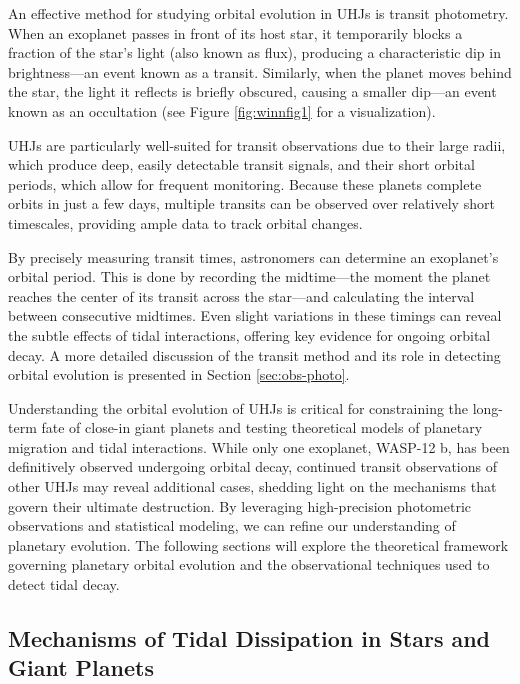 \documentclass[oneside,12pt]{amsart}
\numberwithin{page}{section}
\begin{document}
An effective method for studying orbital evolution in UHJs is transit photometry. When an exoplanet passes in front of its host star, it temporarily blocks a fraction of the star’s light (also known as flux), producing a characteristic dip in brightness—an event known as a transit. Similarly, when the planet moves behind the star, the light it reflects is briefly obscured, causing a smaller dip—an event known as an occultation (see Figure \ref{fig:winnfig1} for a visualization).

UHJs are particularly well-suited for transit observations due to their large radii, which produce deep, easily detectable transit signals, and their short orbital periods, which allow for frequent monitoring. Because these planets complete orbits in just a few days, multiple transits can be observed over relatively short timescales, providing ample data to track orbital changes.

By precisely measuring transit times, astronomers can determine an exoplanet’s orbital period. This is done by recording the midtime—the moment the planet reaches the center of its transit across the star—and calculating the interval between consecutive midtimes. Even slight variations in these timings can reveal the subtle effects of tidal interactions, offering key evidence for ongoing orbital decay. A more detailed discussion of the transit method and its role in detecting orbital evolution is presented in Section \ref{sec:obs-photo}.

Understanding the orbital evolution of UHJs is critical for constraining the long-term fate of close-in giant planets and testing theoretical models of planetary migration and tidal interactions. While only one exoplanet, WASP-12 b, has been definitively observed undergoing orbital decay, continued transit observations of other UHJs may reveal additional cases, shedding light on the mechanisms that govern their ultimate destruction. By leveraging high-precision photometric observations and statistical modeling, we can refine our understanding of planetary evolution. The following sections will explore the theoretical framework governing planetary orbital evolution and the observational techniques used to detect tidal decay.




\subsection{Mechanisms of Tidal Dissipation in Stars and Giant Planets}\label{sec:tidaldissipation}
\end{document}
